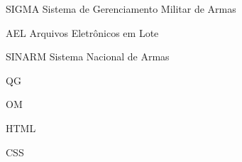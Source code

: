 \begin{siglas}
  \item[SIGMA] Sistema de Gerenciamento Militar de Armas
  \item[AEL] Arquivos Eletrônicos em Lote 
  \item[SINARM] Sistema Nacional de Armas 
  \item[QG] 
  \item[OM] 
  \item[HTML]
  \item[CSS]  
\end{siglas}